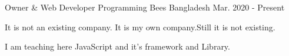 

\begin{cventries}


  \cventry
    {Owner \& Web Developer} %
    {Programming Bees} %
    {Bangladesh} %
    {Mar. 2020 - Present} %
    {
      \begin{cvitems} %
        \item {It is not an existing company. It is my own company.Still it is not existing.}
        \item {I am teaching here JavaScript and it's framework and Library.}
      \end{cvitems}
    }

\end{cventries}
